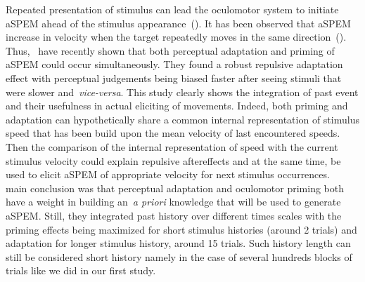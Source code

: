 \documentclass[profile,final,english, draft]{article}%
\newcommand{\citep}[1]{(\cite{#1})}
\begin{document}
Repeated presentation of stimulus can lead the oculomotor system
to initiate aSPEM ahead of the stimulus appearance~\citep{Westheimer1954, KOWLER1979619, KOWLER1979633}.
It has been observed that aSPEM increase in velocity
when the target repeatedly moves in the same direction~\citep{Kowler1984, Kowler1989, Heinen2005}.
Thus,~\citet{Maus2015} have recently shown that
both perceptual adaptation and priming of aSPEM could occur simultaneously.
They found a robust repulsive adaptation effect
with perceptual judgements being biased faster
after seeing stimuli that were slower and~\textit{vice-versa}.
This study clearly shows the integration of past event and
their usefulness in actual eliciting of movements.
Indeed, both priming and adaptation can hypothetically share
a common internal representation of stimulus speed
that has been build upon the mean velocity of last encountered speeds.
Then the comparison of the internal representation of speed
with the current stimulus velocity could explain repulsive aftereffects and
at the same time, be used to elicit aSPEM
of appropriate velocity for next stimulus occurrences.
~\citet{Maus2015} main conclusion was that
perceptual adaptation and oculomotor priming
both have a weight in building an~\textit{a priori} knowledge
that will be used to generate aSPEM.
Still, they integrated past history over different times scales
with the priming effects being maximized
for short stimulus histories (around 2 trials) and
adaptation for longer stimulus history, around 15 trials.
Such history length can still be considered
short history namely in the case of several hundreds blocks
of trials like we did in our first study.
\end{document}
